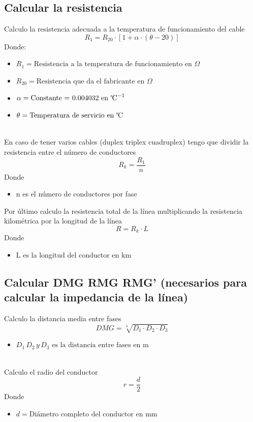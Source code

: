 \documentclass[10pt,a4paper]{article}
\begin{document}
\subsection{Calcular la resistencia}
Calculo la resistencia adecuada a la temperatura de funcionamiento del cable
$$
R_{1}=R_{20} \cdot[1+\alpha \cdot(\theta-20)]
$$
Donde:
\begin{itemize}
    \item $R_{1} = \text{Resistencia a la temperatura de funcionamiento en } \Omega$
    \item $R_{20} = \text{Resistencia que da el fabricante en }\Omega$
    \item $\alpha = \text{Constante = 0.004032 en } \text{\textcelsius}^{-1}$
    \item $\theta = \text{Temperatura de servicio en }\text{\textcelsius}$
\end{itemize}
\\

En caso de tener varios cables (duplex triplex cuadruplex) tengo que dividir la resistencia entre el número de conductores
$$
R_{k}=\frac{R_{1}}{n}
$$
Donde
\begin{itemize}
    \item n es el número de conductores por fase
\end{itemize}
Por último calculo la resistencia total de la línea multiplicando la resistencia kilométrica por la longitud de la línea
$$
R=R_{k} \cdot L
$$
Donde
\begin{itemize}
    \item L es la longitud del conductor en km
\end{itemize}
\subsection{Calcular DMG RMG RMG' (necesarios para calcular la impedancia de la línea)}
Calculo la distancia media entre fases
$$
D M G=\sqrt[3]{D_{1} \cdot D_{2} \cdot D_{3}}
$$
\begin{itemize}
    \item $D_{1} \, D_{2} \,y \,D_{3} \text{ es la distancia entre fases en m}$
\end{itemize}
\\

Calculo el radio del conductor
$$
r = \frac{d}{2}
$$
Donde
\begin{itemize}
    \item $d = \text{Diámetro completo del conductor en mm}$
\end{itemize}
\\
\end{document}
